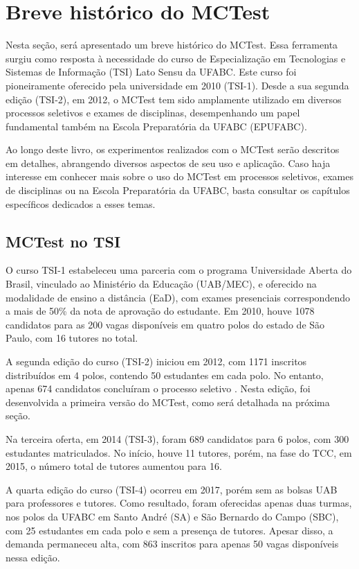 \section{Breve histórico do MCTest}\label{sec:historico}

Nesta seção, será apresentado um breve histórico do MCTest. Essa ferramenta surgiu como resposta à necessidade do curso de Especialização em Tecnologias e Sistemas de Informação (TSI) Lato Sensu da UFABC. Este curso foi pioneiramente oferecido pela universidade em 2010 (TSI-1). Desde a sua segunda edição (TSI-2), em 2012, o MCTest tem sido amplamente utilizado em diversos processos seletivos e exames de disciplinas, desempenhando um papel fundamental também na Escola Preparatória da UFABC (EPUFABC).

Ao longo deste livro, os experimentos realizados com o MCTest serão descritos em detalhes, abrangendo diversos aspectos de seu uso e aplicação. Caso haja interesse em conhecer mais sobre o uso do MCTest em processos seletivos, exames de disciplinas ou na Escola Preparatória da UFABC, basta consultar os capítulos específicos dedicados a esses temas.

\subsection{MCTest no TSI}

O curso TSI-1 estabeleceu uma parceria com o programa Universidade Aberta do Brasil, vinculado ao Ministério da Educação (UAB/MEC), e oferecido na modalidade de ensino a distância (EaD), com exames presenciais correspondendo a mais de 50\% da nota de aprovação do estudante. Em 2010, houve 1078 candidatos para as 200 vagas disponíveis em quatro polos do estado de São Paulo, com 16 tutores no total. 

A segunda edição do curso (TSI-2) iniciou em 2012, com 1171 inscritos distribuídos em 4 polos, contendo 50 estudantes em cada polo. No entanto, apenas 674 candidatos concluíram o processo seletivo \cite{2013:Zampirolli.Quilici-Gonzalez.ea}. Nesta edição, foi desenvolvida a primeira versão do MCTest, como será detalhada na próxima seção.


Na terceira oferta, em 2014 (TSI-3), foram 689 candidatos para 6 polos, com 300 estudantes matriculados. No início, houve 11 tutores, porém, na fase do TCC, em 2015, o número total de tutores aumentou para 16. 

A quarta edição do curso (TSI-4) ocorreu em 2017, porém sem as bolsas UAB para professores e tutores. Como resultado, foram oferecidas apenas duas turmas, nos polos da UFABC em Santo André (SA) e São Bernardo do Campo (SBC), com 25 estudantes em cada polo e sem a presença de tutores. Apesar disso, a demanda permaneceu alta, com 863 inscritos para apenas 50 vagas disponíveis nessa edição.

